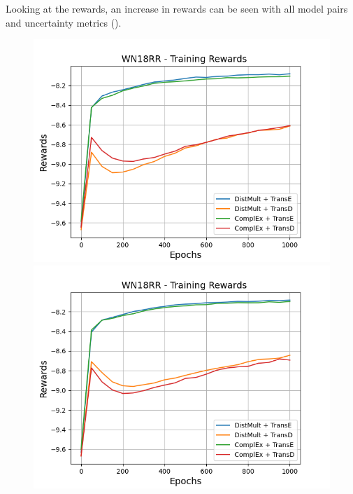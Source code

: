 Looking at the rewards, an increase in rewards can be seen with all model pairs and uncertainty metrics ().
\begin{figure}
    \centering
    \begin{minipage}{.5\textwidth}
      \centering
      \includegraphics[width=0.9\linewidth]{figures/results/gan_train/not_pretrained/uncertainty/max_distribution/entropy/wn18rr/uncertainty_wn18rr_rew.png}
    \end{minipage}%
    \begin{minipage}{.5\textwidth}
      \centering
      \includegraphics[width=0.9\linewidth]{figures/results/gan_train/not_pretrained/uncertainty/max_distribution/least_confidence/wn18rr/uncertainty_wn18rr_rew.png}
    \end{minipage}
    \begin{minipage}{.5\textwidth}

\end{minipage}
\end{figure}
